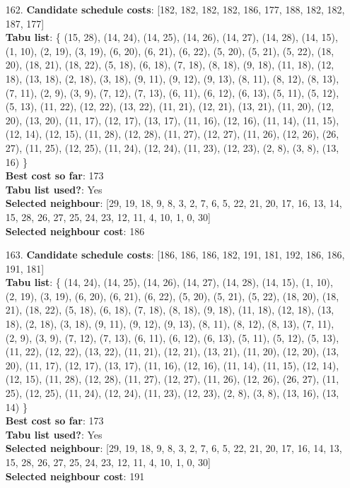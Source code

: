 \documentclass[fleqn]{article}
\begin{document}
\begin{itemize}
    \item[162.] \textbf{Candidate schedule costs}: [182, 182, 182, 182, 186, 177, 188, 182, 182, 187, 177] \\
    \textbf{Tabu list}: \{ (15, 28), (14, 24), (14, 25), (14, 26), (14, 27), (14, 28), (14, 15), (1, 10), (2, 19), (3, 19), (6, 20), (6, 21), (6, 22), (5, 20), (5, 21), (5, 22), (18, 20), (18, 21), (18, 22), (5, 18), (6, 18), (7, 18), (8, 18), (9, 18), (11, 18), (12, 18), (13, 18), (2, 18), (3, 18), (9, 11), (9, 12), (9, 13), (8, 11), (8, 12), (8, 13), (7, 11), (2, 9), (3, 9), (7, 12), (7, 13), (6, 11), (6, 12), (6, 13), (5, 11), (5, 12), (5, 13), (11, 22), (12, 22), (13, 22), (11, 21), (12, 21), (13, 21), (11, 20), (12, 20), (13, 20), (11, 17), (12, 17), (13, 17), (11, 16), (12, 16), (11, 14), (11, 15), (12, 14), (12, 15), (11, 28), (12, 28), (11, 27), (12, 27), (11, 26), (12, 26), (26, 27), (11, 25), (12, 25), (11, 24), (12, 24), (11, 23), (12, 23), (2, 8), (3, 8), (13, 16) \} \\
    \textbf{Best cost so far}: 173 \\
    \textbf{Tabu list used?}: Yes \\
    \textbf{Selected neighbour}: [29, 19, 18, 9, 8, 3, 2, 7, 6, 5, 22, 21, 20, 17, 16, 13, 14, 15, 28, 26, 27, 25, 24, 23, 12, 11, 4, 10, 1, 0, 30] \\
    \textbf{Selected neighbour cost}: 186
      

    \item[163.] \textbf{Candidate schedule costs}: [186, 186, 186, 182, 191, 181, 192, 186, 186, 191, 181] \\
    \textbf{Tabu list}: \{ (14, 24), (14, 25), (14, 26), (14, 27), (14, 28), (14, 15), (1, 10), (2, 19), (3, 19), (6, 20), (6, 21), (6, 22), (5, 20), (5, 21), (5, 22), (18, 20), (18, 21), (18, 22), (5, 18), (6, 18), (7, 18), (8, 18), (9, 18), (11, 18), (12, 18), (13, 18), (2, 18), (3, 18), (9, 11), (9, 12), (9, 13), (8, 11), (8, 12), (8, 13), (7, 11), (2, 9), (3, 9), (7, 12), (7, 13), (6, 11), (6, 12), (6, 13), (5, 11), (5, 12), (5, 13), (11, 22), (12, 22), (13, 22), (11, 21), (12, 21), (13, 21), (11, 20), (12, 20), (13, 20), (11, 17), (12, 17), (13, 17), (11, 16), (12, 16), (11, 14), (11, 15), (12, 14), (12, 15), (11, 28), (12, 28), (11, 27), (12, 27), (11, 26), (12, 26), (26, 27), (11, 25), (12, 25), (11, 24), (12, 24), (11, 23), (12, 23), (2, 8), (3, 8), (13, 16), (13, 14) \} \\
    \textbf{Best cost so far}: 173 \\
    \textbf{Tabu list used?}: Yes \\
    \textbf{Selected neighbour}: [29, 19, 18, 9, 8, 3, 2, 7, 6, 5, 22, 21, 20, 17, 16, 14, 13, 15, 28, 26, 27, 25, 24, 23, 12, 11, 4, 10, 1, 0, 30] \\
    \textbf{Selected neighbour cost}: 191
      


\end{itemize}
\end{document}

